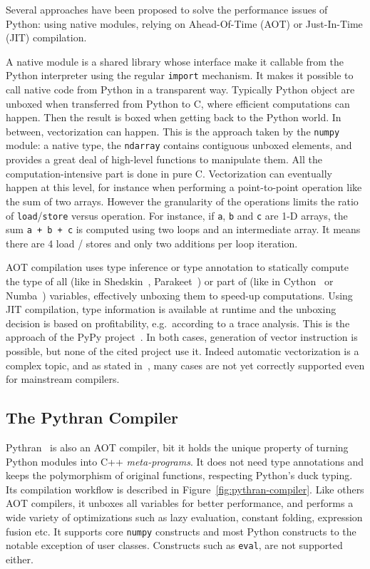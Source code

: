 \documentclass[preprint]{sigplanconf}
\begin{document}
Several approaches have been proposed to solve the performance issues of
Python: using native modules, relying on Ahead-Of-Time (AOT) or Just-In-Time
(JIT) compilation.

A native module is a shared library whose interface make it callable from the
Python interpreter using the regular \texttt{import} mechanism. It makes it
possible to call native code from Python in a transparent way. Typically Python
object are unboxed when transferred from Python to C, where efficient
computations can happen. Then the result is boxed when getting back to the
Python world. In between, vectorization can happen. This is the approach taken
by the \texttt{numpy} module: a native type, the \texttt{ndarray} contains
contiguous unboxed elements, and provides a great deal of high-level functions
to manipulate them. All the computation-intensive part is done in pure C.
Vectorization can eventually happen at this level, for instance when performing
a point-to-point operation like the sum of two arrays. However the granularity
of the operations limits the ratio of \texttt{load}/\texttt{store} versus
operation. For instance, if \texttt{a}, \texttt{b} and \texttt{c} are 1-D
arrays, the sum \texttt{a + b + c} is computed using two loops and an
intermediate array.  It means there are 4 load / stores and only two additions
per loop iteration.

AOT compilation uses type inference or type annotation to statically compute
the type of all (like in Shedskin~\cite{shedskin2006},
Parakeet~\cite{parakeet2012}) or part of (like in Cython~\cite{cython2010} or
Numba~\cite{numba}) variables, effectively unboxing them to speed-up
computations. Using JIT compilation, type information is available at runtime
and the unboxing decision is based on profitability, e.g.\ according to a trace
analysis. This is the approach of the PyPy project~\cite{pypy2009}. In both
cases, generation of vector instruction is possible, but none of the cited
project use it. Indeed automatic vectorization is a complex topic, and as
stated in~\cite{maleki2011}, many cases are not yet correctly supported even
for mainstream compilers.

\subsection{The Pythran Compiler}

Pythran~\cite{pythran2013, pyhpc2013} is also an AOT compiler, bit it holds the
unique property of turning Python modules into C++ \emph{meta-programs}. It
does not need type annotations and keeps the polymorphism of original
functions, respecting Python's duck typing. Its compilation workflow is
described in Figure~\ref{fig:pythran-compiler}.  Like others AOT compilers, it
unboxes all variables for better performance, and performs a wide variety of
optimizations such as lazy evaluation, constant folding, expression fusion etc.
It supports core \texttt{numpy} constructs and most Python constructs to the
notable exception of user classes. Constructs such as \texttt{eval}, are not
supported either.
\end{document}
